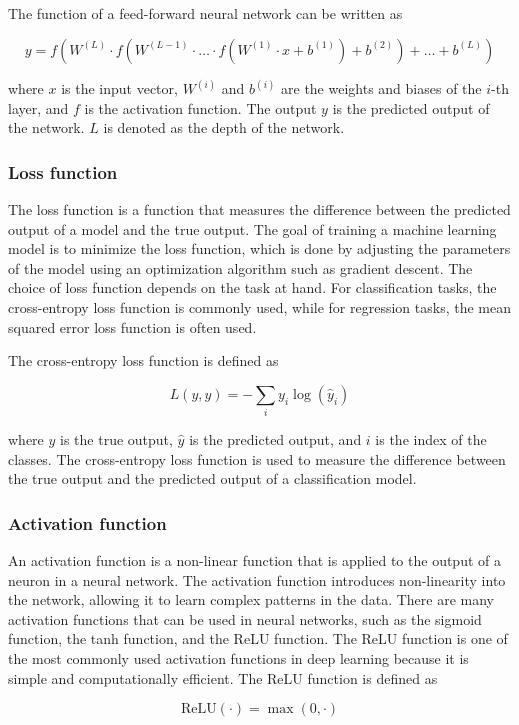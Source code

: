 \documentclass{article}
\begin{document}
The function of a feed-forward neural network can be written as

$$ 
    y = f(W^{(L)} \cdot f(W^{(L-1)} \cdot \ldots \cdot f(W^{(1)} \cdot x + b^{(1)}) + b^{(2)}) + \ldots + b^{(L)})
$$

where $x$ is the input vector, $W^{(i)}$ and $b^{(i)}$ are the weights and biases of the $i$-th layer, and $f$ is the activation function. The output $y$ is the predicted output of the network. $L$ is denoted as the depth of the network.

\subsubsection{Loss function}
The loss function is a function that measures the difference between the predicted output of a model and the true output. The goal of training a machine learning model is to minimize the loss function, which is done by adjusting the parameters of the model using an optimization algorithm such as gradient descent. The choice of loss function depends on the task at hand. For classification tasks, the cross-entropy loss function is commonly used, while for regression tasks, the mean squared error loss function is often used.

The cross-entropy loss function is defined as 

$$
    L(y, \hat{y}) = -\sum_{i} y_i \log(\hat{y}_i)
$$

where $y$ is the true output, $\hat{y}$ is the predicted output, and $i$ is the index of the classes. The cross-entropy loss function is used to measure the difference between the true output and the predicted output of a classification model.

\subsubsection{Activation function}
An activation function is a non-linear function that is applied to the output of a neuron in a neural network. The activation function introduces non-linearity into the network, allowing it to learn complex patterns in the data. There are many activation functions that can be used in neural networks, such as the sigmoid function, the tanh function, and the ReLU function. The ReLU function is one of the most commonly used activation functions in deep learning because it is simple and computationally efficient. The ReLU function is defined as

$$
    \text{ReLU}(\cdot)=\max(0,\cdot)
$$
\end{document}
